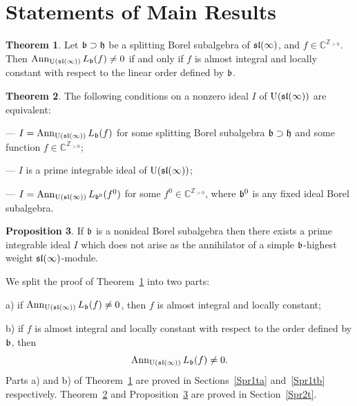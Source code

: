 \documentclass[10pt]{amsart}\oddsidemargin -1mm \evensidemargin -1mm \topmargin -15mm\headheight5mm \headsep 3.5mm \textheight 245mm\textwidth 170mm %
\theoremstyle{definition}\newtheorem{theorem}{Theorem}[section]\newtheorem{lemma}[theorem]{Lemma}\newtheorem{remark}[theorem]{Remark}\newtheorem{proposition}[theorem]{Proposition}\newtheorem{corollary}[theorem]{Corollary}\newtheorem{definition}[theorem]{Definition}\newtheorem{Ex}[theorem]{Example}
\begin{document}
\section{Statements of Main Results}\label{Sstate}
\begin{theorem}\label{1T} Let $\frak b\supset\frak h$ be a splitting Borel subalgebra of $\frak{sl}(\infty)$, and $f\in\mathbb C^{\mathbb Z_{>0}}$. Then $\operatorname{\mathrm{Ann}}_{\operatorname{\mathrm{U}}(\frak{sl}(\infty))} L_{\frak b}(f)\ne 0$ if and only if $f$ is almost integral and locally constant with respect to the linear order defined by $\frak b$.\end{theorem}
\begin{theorem}\label{2T} The following conditions on a nonzero ideal $I$ of $\operatorname{\mathrm{U}}(\frak{sl}(\infty))$ are equivalent:

--- $I=\operatorname{\mathrm{Ann}}_{\operatorname{\mathrm{U}}(\frak{sl}(\infty))} L_{\frak b}(f)$ for some splitting Borel subalgebra $\frak b\supset\frak h$ and some function $f\in\mathbb C^{\mathbb Z_{>0}}$;

--- $I$ is a prime integrable ideal of $\operatorname{\mathrm{U}}(\frak{sl}(\infty))$;

--- $I=\operatorname{\mathrm{Ann}}_{\operatorname{\mathrm{U}}(\frak{sl}(\infty))} L_{\frak b^0}(f^0)$ for some $f^0\in\mathbb C^{\mathbb Z_{>0}}$, where $\frak b^0$ is any fixed ideal Borel subalgebra.
\end{theorem}
\begin{proposition}\label{Pp} If $\frak b$ is a nonideal Borel subalgebra then there exists a prime integrable ideal $I$ which does not arise as the annihilator of a simple $\frak b$-highest weight $\frak{sl}(\infty)$-module.\end{proposition}




We split the proof of Theorem~\ref{1T} into two parts:

a) if $\operatorname{\mathrm{Ann}}_{\operatorname{\mathrm{U}}(\frak{sl}(\infty))} L_{\frak b}(f)\ne0$, then $f$ is almost integral and locally constant;

b) if $f$ is almost integral and locally constant with respect to the order defined by $\frak b$, then $$\operatorname{\mathrm{Ann}}_{\operatorname{\mathrm{U}}(\frak{sl}(\infty))} L_{\frak b}(f)\ne0.$$
Parts a) and b) of Theorem~\ref{1T} are proved in Sections~\ref{Spr1ta} and~\ref{Spr1tb} respectively. Theorem~\ref{2T} and Proposition~\ref{Pp} are proved in Section~\ref{Spr2t}.
\end{document}

